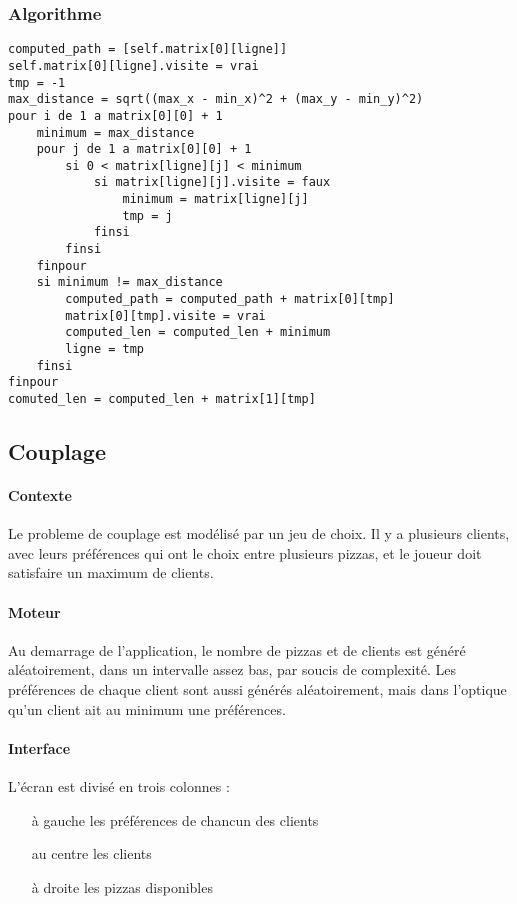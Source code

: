         \subsubsection{Algorithme}
        \begin{lstlisting}
computed_path = [self.matrix[0][ligne]]
self.matrix[0][ligne].visite = vrai
tmp = -1
max_distance = sqrt((max_x - min_x)^2 + (max_y - min_y)^2)
pour i de 1 a matrix[0][0] + 1
    minimum = max_distance
    pour j de 1 a matrix[0][0] + 1
        si 0 < matrix[ligne][j] < minimum
            si matrix[ligne][j].visite = faux
                minimum = matrix[ligne][j]
                tmp = j
            finsi
        finsi
    finpour
    si minimum != max_distance
        computed_path = computed_path + matrix[0][tmp]
        matrix[0][tmp].visite = vrai
        computed_len = computed_len + minimum
        ligne = tmp
    finsi
finpour
comuted_len = computed_len + matrix[1][tmp]
        \end{lstlisting}


	\subsection{Couplage}
		\paragraph{Contexte}
			Le probleme de couplage est modélisé par un jeu de choix.
			Il y a plusieurs clients, avec leurs préférences qui ont
			 le choix entre plusieurs pizzas, et le joueur doit
			 satisfaire un maximum de clients.
		\paragraph{Moteur}
			Au demarrage de l'application, le nombre de pizzas et
			 de clients est généré aléatoirement, dans un intervalle
			 assez bas, par soucis de complexité.
			Les préférences de chaque client sont aussi générés aléatoirement,
			 mais dans l'optique qu'un client ait au minimum une préférences.
		\paragraph{Interface}
		    L'écran est divisé en trois colonnes :
		    \begin{itemize}
		        \item[à gauche] les préférences de chancun des clients
		        \item[au centre] les clients
		        \item[à droite] les pizzas disponibles
		    \end{itemize}

